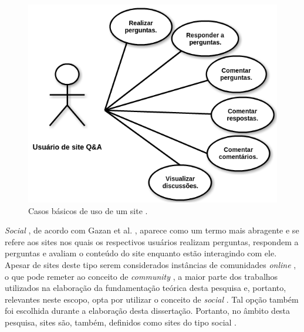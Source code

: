     \begin{figure}[H]
        \center
        \includegraphics[scale=.5]{./figuras/casosdeusositesqa.png}
        \caption{Casos básicos de uso de um site \qanospace.}
        \label{fig:casosdeusositesqa}
    \end{figure}


\textit{Social} \qanospace, de acordo com Gazan et al. \cite{gazan2011social}, aparece como um termo mais abragente e se refere aos sites nos quais os respectivos usuários realizam perguntas, respondem a perguntas e avaliam o conteúdo do site enquanto estão interagindo com ele. Apesar de sites deste tipo serem considerados instâncias de comunidades \textit{online} \cite{rosenbaum2010structuration}, o que pode remeter ao conceito de \textit{community} \qanospace, a maior parte dos trabalhos utilizados na elaboração da fundamentação teórica desta pesquisa e, portanto, relevantes neste escopo, opta por utilizar o conceito de \textit{social} \qanospace. Tal opção também foi escolhida durante a elaboração desta dissertação. Portanto, no âmbito desta pesquisa, sites \qa  são, também, definidos como sites do tipo social \qanospace.


